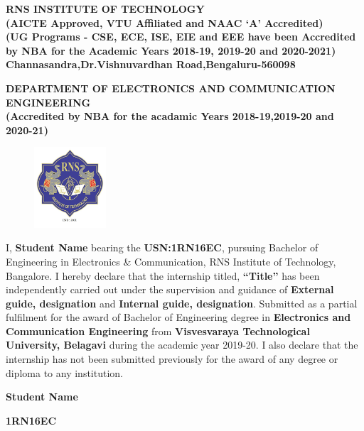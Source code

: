 %
\setlength{\toptafiddle}{1in}
\setlength{\bottafiddle}{1in}
\vspace*{-0.5in}
\enlargethispage{\bottafiddle}
\thispagestyle{empty}


\begin{center}
\small\textbf{\color{blue}	RNS INSTITUTE OF TECHNOLOGY\\
(AICTE Approved, VTU Affiliated and NAAC `A' Accredited)\\
(UG Programs - CSE, ECE, ISE, EIE and EEE have been Accredited by NBA for the Academic Years 2018-19, 2019-20 and 2020-2021)\\
Channasandra,Dr.Vishnuvardhan Road,Bengaluru-560098}\\
\vspace{0.3cm}

\small\textbf{DEPARTMENT OF ELECTRONICS AND COMMUNICATION ENGINEERING\\
(Accredited by NBA for the acadamic Years 2018-19,2019-20 and 2020-21)
}
\end{center}

\begin{center}
\begin{figure}[h]
\centering
\includegraphics[height=3cm]{images/rns1.jpg}
\end{figure}
\Large{\textbf{\color{red}{DECLARATION}}}
\end{center}

I, \textbf{Student Name} bearing the \textbf{USN:1RN16EC}, pursuing Bachelor of\\ Engineering in Electronics \& Communication, RNS Institute of Technology, Bangalore. I hereby declare that the internship titled, \textbf{“Title”} has been independently carried out under the supervision and guidance of \textbf{External guide, designation} and \textbf{Internal guide, designation}. Submitted as a partial fulfilment for the award of Bachelor of Engineering degree in \textbf{\color{blue}Electronics and Communication Engineering} from \textbf{\color{blue}Visvesvaraya Technological University, Belagavi} during the academic year 2019-20. I also declare that the internship has not been submitted previously for the award of any degree or diploma to any institution.


\vspace{1.5cm}

\begin{flushright}\textbf{Student Name}\end{flushright}
\begin{flushright}\small\textbf{1RN16EC}\end{flushright}

